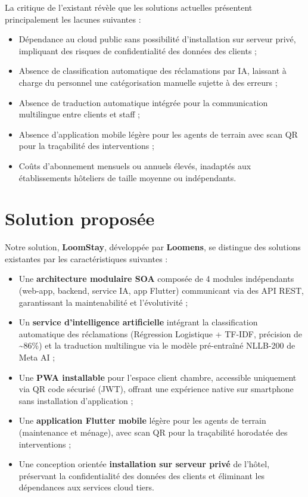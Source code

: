 La critique de l'existant révèle que les solutions actuelles présentent principalement les lacunes suivantes :
\begin{itemize}
  \item Dépendance au cloud public sans possibilité d'installation sur serveur privé, impliquant des risques de confidentialité des données des clients ;
  \item Absence de classification automatique des réclamations par IA, laissant à charge du personnel une catégorisation manuelle sujette à des erreurs ;
  \item Absence de traduction automatique intégrée pour la communication multilingue entre clients et staff ;
  \item Absence d'application mobile légère pour les agents de terrain avec scan QR pour la traçabilité des interventions ;
  \item Coûts d'abonnement mensuels ou annuels élevés, inadaptés aux établissements hôteliers de taille moyenne ou indépendants.
\end{itemize}

\section{Solution proposée}
\label{sec:solution_proposee}

Notre solution, \textbf{LoomStay}, développée par \textbf{Loomens}, se distingue des solutions existantes par les caractéristiques suivantes :

\begin{itemize}
  \item Une \textbf{architecture modulaire SOA} composée de 4 modules indépendants (web-app, backend, service IA, app Flutter) communicant via des API REST, garantissant la maintenabilité et l'évolutivité ;
  \item Un \textbf{service d'intelligence artificielle} intégrant la classification automatique des réclamations (Régression Logistique + TF-IDF, précision de \textasciitilde{}86\%) et la traduction multilingue via le modèle pré-entraîné NLLB-200 de Meta AI ;
  \item Une \textbf{PWA installable} pour l'espace client chambre, accessible uniquement via QR code sécurisé (JWT), offrant une expérience native sur smartphone sans installation d'application ;
  \item Une \textbf{application Flutter mobile} légère pour les agents de terrain (maintenance et ménage), avec scan QR pour la traçabilité horodatée des interventions ;
  \item Une conception orientée \textbf{installation sur serveur privé} de l'hôtel, préservant la confidentialité des données des clients et éliminant les dépendances aux services cloud tiers.
\end{itemize}

